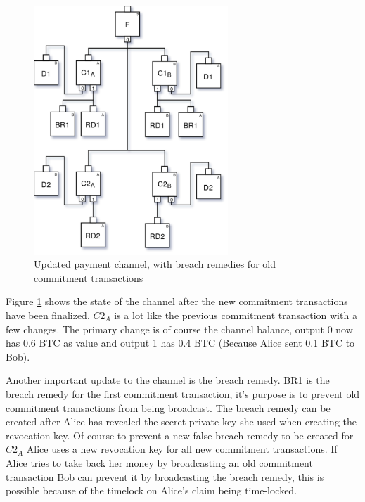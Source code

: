 \begin{figure}[H]
	\centering
	\includegraphics[width=0.65\textwidth]{background/images/payment_channel_updated.png}
	\caption{Updated payment channel, with breach remedies for old commitment transactions}
	\label{fig:pc-update}
\end{figure}

Figure \ref{fig:pc-update} shows the state of the channel after the new commitment transactions have been finalized. 
$C2_{A}$ is a lot like the previous commitment transaction with a few changes. The primary change is of course the channel balance, output 0 now has 0.6 BTC as value and output 1 has 0.4 BTC (Because Alice sent 0.1 BTC to Bob).

Another important update to the channel is the breach remedy. BR1 is the breach remedy for the first commitment transaction, it's purpose is to prevent old commitment transactions from being broadcast.\cite{lightningnetwork_2019} The breach remedy can be created after Alice has revealed the secret private key she used when creating the revocation key. Of course to prevent a new false breach remedy to be created for $C2_{A}$ Alice uses a new revocation key for all new commitment transactions. If Alice tries to take back her money by broadcasting an old commitment transaction Bob can prevent it by broadcasting the breach remedy, this is possible because of the timelock on Alice's claim being time-locked.\cite{lightningnetwork_2019}

